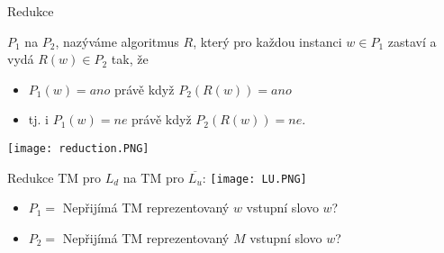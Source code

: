     \begin{frame}{Redukce}
    \begin{minipage}{0.57\textwidth}
    \begin{definition}[Redukce]
     $P_1$ na $P_2$, nazýváme algoritmus $R$, který pro každou instanci $w\in P_1$ zastaví a vydá $R(w)\in P_2$
    tak, že 
    \begin{itemize}
        \item $P_1(w)=ano$ právě když $P_2(R(w))=ano$ 
        \item tj. i $P_1(w)=ne$ právě když $P_2(R(w))=ne$. 
    \end{itemize}
    \end{definition}
    \end{minipage}
    \begin{minipage}{0.01\textwidth}
    \end{minipage}
    \begin{minipage}{0.41\textwidth}
    \texttt{[image: reduction.PNG]}
    \end{minipage}
    \begin{example}
    \begin{minipage}{0.48\textwidth}
    Redukce  TM pro $L_d$ na  TM pro $\overline{L_u}$:
    \texttt{[image: LU.PNG]}
    \end{minipage}
    \begin{minipage}{0.01\textwidth}
    \end{minipage}
    \begin{minipage}{0.41\textwidth}
    \begin{itemize}
        \item $P_1=$ Nepřijímá TM reprezentovaný $w$ vstupní slovo $w$?
        \item $P_2=$ Nepřijímá TM reprezentovaný $M$ vstupní slovo $w$?
        \end{itemize}
    \end{minipage}
    \end{example}
    \end{frame}
    
